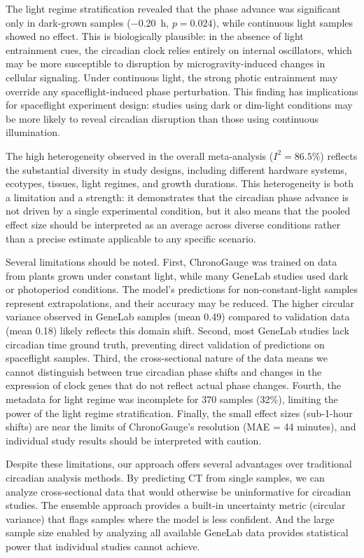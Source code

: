 \documentclass[11pt,a4paper]{article}
\begin{document}
The light regime stratification revealed that the phase advance was significant only in dark-grown samples ($-$0.20~h, $p = 0.024$), while continuous light samples showed no effect. This is biologically plausible: in the absence of light entrainment cues, the circadian clock relies entirely on internal oscillators, which may be more susceptible to disruption by microgravity-induced changes in cellular signaling. Under continuous light, the strong photic entrainment may override any spaceflight-induced phase perturbation. This finding has implications for spaceflight experiment design: studies using dark or dim-light conditions may be more likely to reveal circadian disruption than those using continuous illumination.

The high heterogeneity observed in the overall meta-analysis ($I^2 = 86.5\%$) reflects the substantial diversity in study designs, including different hardware systems, ecotypes, tissues, light regimes, and growth durations. This heterogeneity is both a limitation and a strength: it demonstrates that the circadian phase advance is not driven by a single experimental condition, but it also means that the pooled effect size should be interpreted as an average across diverse conditions rather than a precise estimate applicable to any specific scenario.

Several limitations should be noted. First, ChronoGauge was trained on data from plants grown under constant light, while many GeneLab studies used dark or photoperiod conditions. The model's predictions for non-constant-light samples represent extrapolations, and their accuracy may be reduced. The higher circular variance observed in GeneLab samples (mean 0.49) compared to validation data (mean 0.18) likely reflects this domain shift. Second, most GeneLab studies lack circadian time ground truth, preventing direct validation of predictions on spaceflight samples. Third, the cross-sectional nature of the data means we cannot distinguish between true circadian phase shifts and changes in the expression of clock genes that do not reflect actual phase changes. Fourth, the metadata for light regime was incomplete for 370 samples (32\%), limiting the power of the light regime stratification. Finally, the small effect sizes (sub-1-hour shifts) are near the limits of ChronoGauge's resolution (MAE = 44 minutes), and individual study results should be interpreted with caution.

Despite these limitations, our approach offers several advantages over traditional circadian analysis methods. By predicting CT from single samples, we can analyze cross-sectional data that would otherwise be uninformative for circadian studies. The ensemble approach provides a built-in uncertainty metric (circular variance) that flags samples where the model is less confident. And the large sample size enabled by analyzing all available GeneLab data provides statistical power that individual studies cannot achieve.
\end{document}
